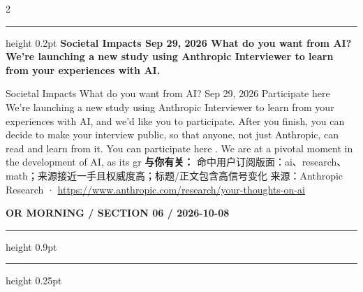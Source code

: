 \documentclass[10.5pt]{ctexart}
\begin{document}
\begin{multicols}{2}
\vspace{2mm}
\hrule height 0.2pt
\vspace{2mm}
{\large\bfseries Societal Impacts Sep 29, 2026 What do you want from AI? We’re launching a new study using Anthropic Interviewer to learn from your experiences with AI.}\par
Societal Impacts What do you want from AI? Sep 29, 2026 Participate here We’re launching a new study using Anthropic Interviewer to learn from your experiences with AI, and we’d like you to participate. After you finish, you can decide to make your interview public, so that anyone, not just Anthropic, can read and learn from it. You can participate here . We are at a pivotal moment in the development of AI, as its gr
\textbf{与你有关：} 命中用户订阅版面：ai、research、math；来源接近一手且权威度高；标题/正文包含高信号变化
{\footnotesize\color{ormuted} 来源：Anthropic Research · \url{https://www.anthropic.com/research/your-thoughts-on-ai}}
\end{multicols}
\newpage
{\small\bfseries OR MORNING / SECTION 06 / 2026-10-08}
\vspace{2mm}
\hrule height 0.9pt
\vspace{1.5mm}
\hrule height 0.25pt
\vspace{4mm}
\end{document}
